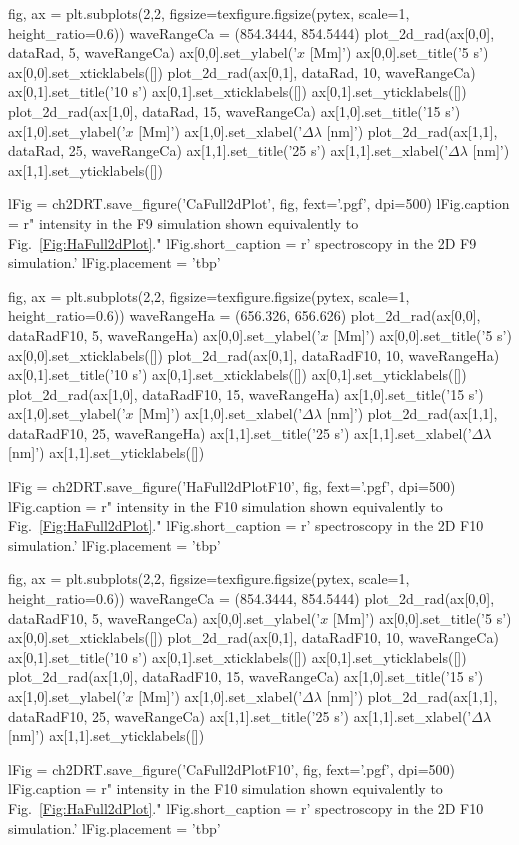 \begin{pycode}[2DRT]
fig, ax = plt.subplots(2,2, figsize=texfigure.figsize(pytex, scale=1, height_ratio=0.6))
waveRangeCa = (854.3444, 854.5444)
plot_2d_rad(ax[0,0], dataRad, 5, waveRangeCa)
ax[0,0].set_ylabel('$x$ [Mm]')
ax[0,0].set_title('5 s')
ax[0,0].set_xticklabels([])
plot_2d_rad(ax[0,1], dataRad, 10, waveRangeCa)
ax[0,1].set_title('10 s')
ax[0,1].set_xticklabels([])
ax[0,1].set_yticklabels([])
plot_2d_rad(ax[1,0], dataRad, 15, waveRangeCa)
ax[1,0].set_title('15 s')
ax[1,0].set_ylabel('$x$ [Mm]')
ax[1,0].set_xlabel('$\Delta\lambda$ [nm]')
plot_2d_rad(ax[1,1], dataRad, 25, waveRangeCa)
ax[1,1].set_title('25 s')
ax[1,1].set_xlabel('$\Delta\lambda$ [nm]')
ax[1,1].set_yticklabels([])

lFig = ch2DRT.save_figure('CaFull2dPlot', fig, fext='.pgf', dpi=500)
lFig.caption = r"\CaLine{} intensity in the F9 simulation shown equivalently to Fig.~\ref{Fig:HaFull2dPlot}."
lFig.short_caption = r'\CaLine{} spectroscopy in the 2D F9 simulation.'
lFig.placement = 'tbp'

fig, ax = plt.subplots(2,2, figsize=texfigure.figsize(pytex, scale=1, height_ratio=0.6))
waveRangeHa = (656.326, 656.626)
plot_2d_rad(ax[0,0], dataRadF10, 5, waveRangeHa)
ax[0,0].set_ylabel('$x$ [Mm]')
ax[0,0].set_title('5 s')
ax[0,0].set_xticklabels([])
plot_2d_rad(ax[0,1], dataRadF10, 10, waveRangeHa)
ax[0,1].set_title('10 s')
ax[0,1].set_xticklabels([])
ax[0,1].set_yticklabels([])
plot_2d_rad(ax[1,0], dataRadF10, 15, waveRangeHa)
ax[1,0].set_title('15 s')
ax[1,0].set_ylabel('$x$ [Mm]')
ax[1,0].set_xlabel('$\Delta\lambda$ [nm]')
plot_2d_rad(ax[1,1], dataRadF10, 25, waveRangeHa)
ax[1,1].set_title('25 s')
ax[1,1].set_xlabel('$\Delta\lambda$ [nm]')
ax[1,1].set_yticklabels([])

lFig = ch2DRT.save_figure('HaFull2dPlotF10', fig, fext='.pgf', dpi=500)
lFig.caption = r"\Ha{} intensity in the F10 simulation shown equivalently to Fig.~\ref{Fig:HaFull2dPlot}."
lFig.short_caption = r'\Ha{} spectroscopy in the 2D F10 simulation.'
lFig.placement = 'tbp'

fig, ax = plt.subplots(2,2, figsize=texfigure.figsize(pytex, scale=1, height_ratio=0.6))
waveRangeCa = (854.3444, 854.5444)
plot_2d_rad(ax[0,0], dataRadF10, 5, waveRangeCa)
ax[0,0].set_ylabel('$x$ [Mm]')
ax[0,0].set_title('5 s')
ax[0,0].set_xticklabels([])
plot_2d_rad(ax[0,1], dataRadF10, 10, waveRangeCa)
ax[0,1].set_title('10 s')
ax[0,1].set_xticklabels([])
ax[0,1].set_yticklabels([])
plot_2d_rad(ax[1,0], dataRadF10, 15, waveRangeCa)
ax[1,0].set_title('15 s')
ax[1,0].set_ylabel('$x$ [Mm]')
ax[1,0].set_xlabel('$\Delta\lambda$ [nm]')
plot_2d_rad(ax[1,1], dataRadF10, 25, waveRangeCa)
ax[1,1].set_title('25 s')
ax[1,1].set_xlabel('$\Delta\lambda$ [nm]')
ax[1,1].set_yticklabels([])

lFig = ch2DRT.save_figure('CaFull2dPlotF10', fig, fext='.pgf', dpi=500)
lFig.caption = r"\CaLine{} intensity in the F10 simulation shown equivalently to Fig.~\ref{Fig:HaFull2dPlot}."
lFig.short_caption = r'\CaLine{} spectroscopy in the 2D F10 simulation.'
lFig.placement = 'tbp'
\end{pycode}

